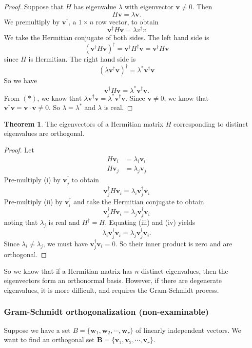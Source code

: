 \documentclass[a4paper]{article}
\theoremstyle{definition}
\newtheorem*{thm}{Theorem}
\newcommand{\mb}[1]{\mathbf{#1}}
\begin{document}
\begin{proof}
  Suppose that $H$ has eigenvalue $\lambda$ with eigenvector $\mb{v}\not= 0$. Then
  \[
  H\mb{v} = \lambda\mb{v}.
  \]
We premultiply by $\mb{v}^\dagger$, a $1\times n$ row vector, to obtain
\[
\mb{v}^\dagger H\mb{v} = \lambda v^\dagger v\tag{$*$}\]
We take the Hermitian conjugate of both sides. The left hand side is
\[
(\mb{v}^\dagger H\mb{v})^\dagger = \mb{v}^\dagger H^\dagger \mb{v} = \mb{v}^\dagger H \mb{v}
\]
since $H$ is Hermitian. The right hand side is
\[
(\lambda\mb{v}^\dagger\mb{v})^\dagger = \lambda^* \mb{v}^\dagger \mb{v}
\]
So we have
\[
\mb{v}^\dagger H\mb{v} = \lambda^* \mb{v}^\dagger \mb{v}.
\]
From $(*)$, we know that $\lambda \mb{v}^\dagger \mb{v} = \lambda^* \mb{v}^\dagger \mb{v}$. Since $\mb{v} \not= 0$, we know that $\mb{v}^\dagger \mb{v} = \mb{v}\cdot \mb{v} \not =0$. So $\lambda = \lambda^*$ and $\lambda$ is real.
\end{proof}

\begin{thm}
  The eigenvectors of a Hermitian matrix $H$ corresponding to distinct eigenvalues are orthogonal. 
\end{thm}

\begin{proof}
  Let
  \begin{align*}
    H\mb{v}_i &= \lambda_i\mb{v}_i\tag{i}\\
    H\mb{v}_j &= \lambda_j\mb{v}_j\tag{ii}
  \end{align*}
  Pre-multiply (i) by $\mb{v}_j^\dagger$ to obtain
\[
\mb{v}_j^\dagger H\mb{v}_i = \lambda_i \mb{v}_j^\dagger \mb{v}_i\tag{iii}
\]
  Pre-multiply (ii) by $\mb{v}_i^\dagger$ and take the Hermitian conjugate to obtain
\[
  \mb{v}_j^\dagger H\mb{v}_i = \lambda_j \mb{v}_j^\dagger \mb{v}_i\tag{iv}
\]
noting that $\lambda_j$ is real and $H^\dagger =H$. Equating (iii) and (iv) yields
\[
\lambda_i \mb{v}_j^\dagger \mb{v}_i = \lambda_j \mb{v}_j^\dagger \mb{v}_i.
\]
Since $\lambda_i\not= \lambda_j$, we must have $\mb{v}_j^\dagger\mb{v}_i = 0$. So their inner product is zero and are orthogonal. 
\end{proof}

So we know that if a Hermitian matrix has $n$ distinct eigenvalues, then the eigenvectors form an orthonormal basis. However, if there are degenerate eigenvalues, it is more difficult, and requires the Gram-Schmidt process.

\subsubsection{Gram-Schmidt orthogonalization (non-examinable)}
Suppose we have a set $B = \{\mb{w}_1, \mb{w}_2, \cdots, \mb{w}_r\}$ of linearly independent vectors. We want to find an orthogonal set $\tilde{\mb{B}} = \{\mb{v}_1, \mb{v}_2, \cdots, \mb{v}_r\}$.
\end{document}
